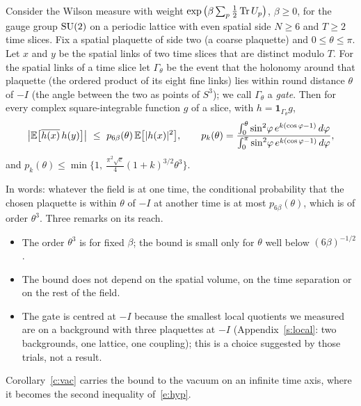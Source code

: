 \begin{theorem}\label{t:ret}
Consider the Wilson measure with weight $\exp\big(\beta\sum_p\tfrac12\operatorname{Tr} U_p\big)$, $\beta\ge0$, for the gauge
group $\mathrm{SU}(2)$ on a periodic lattice with even spatial side $N\ge6$ and $T\ge2$ time slices. Fix a spatial
plaquette of side two (a coarse plaquette) and $0\le\theta\le\pi$. Let $x$ and $y$ be the spatial links of
two time slices that are distinct modulo $T$. For the spatial links of a time slice let $\Gamma_\theta$ be the
event that the holonomy around that plaquette (the ordered product of its eight fine links) lies within round
distance $\theta$ of $-I$ (the angle between the two as points of $S^3$); we call $\Gamma_\theta$ a
\emph{gate}. Then for every complex square-integrable function $g$ of a slice, with
$h=\mathbf 1_{\Gamma_\theta}g$,
\begin{equation}\label{e:ret}
\big|\E\big[\overline{h(x)}\,h(y)\big]\big|\ \le\ p_{6\beta}(\theta)\,\E\big[|h(x)|^2\big],
\qquad
p_k(\theta)=\frac{\int_0^\theta\sin^2\!\varphi\,e^{k(\cos\varphi-1)}\,d\varphi}{\int_0^\pi\sin^2\!\varphi\,e^{k(\cos\varphi-1)}\,d\varphi},
\end{equation}
and $p_k(\theta)\le\min\{1,\ \tfrac{\pi^2\sqrt e}{4}(1+k)^{3/2}\theta^3\}$.
\end{theorem}

In words: whatever the field is at one time, the conditional probability that the chosen plaquette is within
$\theta$ of $-I$ at another time is at most $p_{6\beta}(\theta)$, which is of order $\theta^3$. Three remarks
on its reach.
\begin{itemize}
\item The order $\theta^3$ is for fixed $\beta$; the bound is small only for $\theta$ well below
$(6\beta)^{-1/2}$.
\item The bound does not depend on the spatial volume, on the time separation or on the rest of the field.
\item The gate is centred at $-I$ because the smallest local quotients we measured are on a background with
three plaquettes at $-I$ (Appendix~\ref{s:local}: two backgrounds, one lattice, one coupling); this is a
choice suggested by those trials, not a result.
\end{itemize}
Corollary~\ref{c:vac} carries the bound to the vacuum on an infinite time axis, where it becomes the second
inequality of~\eqref{e:hyp}.

